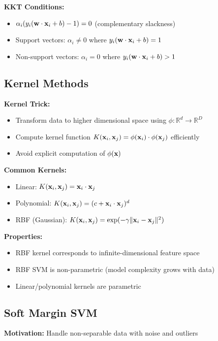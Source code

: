 \documentclass{article}
\begin{document}
\textbf{KKT Conditions:}
\begin{itemize}
    \item $\alpha_i (y_i(\mathbf{w} \cdot \mathbf{x}_i + b) - 1) = 0$ (complementary slackness)
    \item Support vectors: $\alpha_i \neq 0$ where $y_i(\mathbf{w} \cdot \mathbf{x}_i + b) = 1$
    \item Non-support vectors: $\alpha_i = 0$ where $y_i(\mathbf{w} \cdot \mathbf{x}_i + b) > 1$
\end{itemize}

\subsection{Kernel Methods}

\textbf{Kernel Trick:}
\begin{itemize}
    \item Transform data to higher dimensional space using $\phi: \mathbb{R}^d \rightarrow \mathbb{R}^D$
    \item Compute kernel function $K(\mathbf{x}_i, \mathbf{x}_j) = \phi(\mathbf{x}_i) \cdot \phi(\mathbf{x}_j)$ efficiently
    \item Avoid explicit computation of $\phi(\mathbf{x})$
\end{itemize}

\textbf{Common Kernels:}
\begin{itemize}
    \item Linear: $K(\mathbf{x}_i, \mathbf{x}_j) = \mathbf{x}_i \cdot \mathbf{x}_j$
    \item Polynomial: $K(\mathbf{x}_i, \mathbf{x}_j) = (c + \mathbf{x}_i \cdot \mathbf{x}_j)^d$
    \item RBF (Gaussian): $K(\mathbf{x}_i, \mathbf{x}_j) = \exp(-\gamma \|\mathbf{x}_i - \mathbf{x}_j\|^2)$
\end{itemize}

\textbf{Properties:}
\begin{itemize}
    \item RBF kernel corresponds to infinite-dimensional feature space
    \item RBF SVM is non-parametric (model complexity grows with data)
    \item Linear/polynomial kernels are parametric
\end{itemize}

\subsection{Soft Margin SVM}

\textbf{Motivation:} Handle non-separable data with noise and outliers
\end{document}
